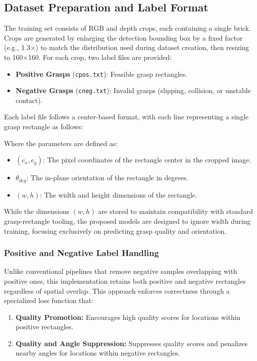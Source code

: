 \subsection{Dataset Preparation and Label Format}
The training set consists of RGB and depth crops, each containing a single brick. Crops are generated by enlarging the detection bounding box by a fixed factor (e.g., 1.3×) to match the distribution used during dataset creation, then resizing to 160×160. For each crop, two label files are provided:
\begin{itemize}
    \item \textbf{Positive Grasps} (\texttt{cpos.txt}): Feasible grasp rectangles.
    \item \textbf{Negative Grasps} (\texttt{cneg.txt}): Invalid grasps (slipping, collision, or unstable contact).
\end{itemize}
Each label file follows a center-based format, with each line representing a single grasp rectangle as follows:
\begin{equation}
    [c_x, \quad c_y, \quad \theta_{deg}, \quad w, \quad h]
\end{equation}

Where the parameters are defined as:
\begin{itemize}
    \item $(c_x, c_y)$: The pixel coordinates of the rectangle center in the cropped image.
    \item $\theta_{deg}$: The in-plane orientation of the rectangle in degrees.
    \item $(w, h)$: The width and height dimensions of the rectangle. 
\end{itemize}



While the dimensions $(w, h)$ are stored to maintain compatibility with standard grasp-rectangle tooling, the proposed models are designed to ignore width during training, focusing exclusively on predicting grasp quality and orientation.

\subsubsection{Positive and Negative Label Handling}
Unlike conventional pipelines that remove negative samples overlapping with positive ones, this implementation retains both positive and negative rectangles regardless of spatial overlap. This approach enforces correctness through a specialized loss function that:
\begin{enumerate}
    \item \textbf{Quality Promotion:} Encourages high quality scores for locations within positive rectangles.
    \item \textbf{Quality and Angle Suppression:} Suppresses quality scores and penalizes nearby angles for locations within negative rectangles.
\end{enumerate}

